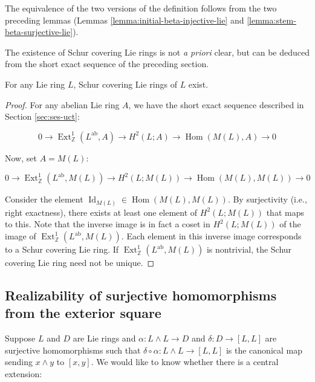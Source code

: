 \documentclass{ucetd}
\begin{document}
The equivalence of the two versions of the definition follows from the
two preceding lemmas (Lemmas \ref{lemma:initial-beta-injective-lie} and
\ref{lemma:stem-beta-surjective-lie}).

The existence of Schur covering Lie rings is not {\em a priori} clear,
but can be deduced from the short exact sequence of the preceding
section. 

\begin{theorem}\label{thm:schur-covering-lie-rings-exist}
  For any Lie ring $L$, Schur covering Lie rings of $L$ exist.
\end{theorem}

\begin{proof}
  For any abelian Lie ring $A$, we have the short exact sequence
  described in Section \ref{sec:ses-uct}:

  \begin{equation*}
    0 \to \operatorname{Ext}^1_{\mathbb{Z}}(L^{\operatorname{ab}},A) \to H^2(L;A) \to \operatorname{Hom}(M(L),A) \to 0
  \end{equation*}
  
  Now, set $A = M(L)$:

  \begin{equation*}
    0 \to \operatorname{Ext}^1_{\mathbb{Z}}(L^{\operatorname{ab}},M(L)) \to H^2(L;M(L)) \to \operatorname{Hom}(M(L),M(L)) \to 0
  \end{equation*}
  
  Consider the element $\operatorname{Id}_{M(L)} \in
  \operatorname{Hom}(M(L),M(L))$. By surjectivity (i.e., right
  exactness), there exists at least one element of $H^2(L;M(L))$ that
  maps to this. Note that the inverse image is in fact a coset in
  $H^2(L;M(L))$ of the image of
  $\operatorname{Ext}^1_{\mathbb{Z}}(L^{\operatorname{ab}},M(L))$. Each
  element in this inverse image corresponds to a Schur covering
  Lie ring. If
  $\operatorname{Ext}^1_{\mathbb{Z}}(L^{\operatorname{ab}},M(L))$ is
  nontrivial, the Schur covering Lie ring need not be unique.
\end{proof}

\subsection{Realizability of surjective homomorphisms from the exterior square}

Suppose $L$ and $D$ are Lie rings and $\alpha:L \wedge L \to D$ and
$\delta:D \to [L,L]$ are surjective homomorphisms such that $\delta
\circ \alpha:L \wedge L \to [L,L]$ is the canonical map sending $x
\wedge y$ to $[x,y]$. We would like to know whether there is a central
extension:
\end{document}
